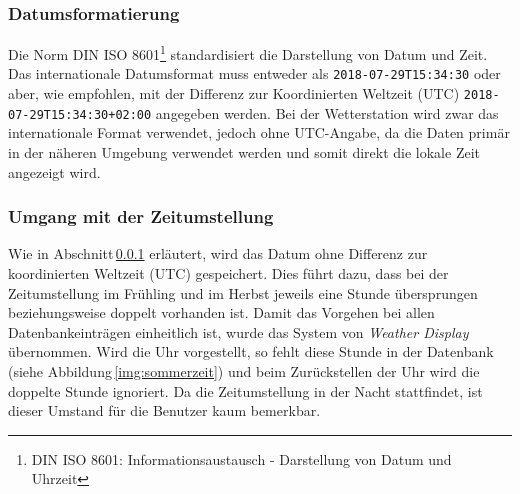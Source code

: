 





\subsubsection{Datumsformatierung}
\label{kap:dateformat}
Die Norm DIN ISO 8601\footnote{DIN ISO 8601: Informationsaustausch - Darstellung von Datum und Uhrzeit} standardisiert die Darstellung von Datum und Zeit. Das internationale Datumsformat muss entweder als \texttt{2018-07-29T15:34:30} oder aber, wie empfohlen, mit der Differenz zur Koordinierten Weltzeit (UTC) \texttt{2018-07-29T15:34:30+02:00} angegeben werden. Bei der Wetterstation wird zwar das internationale Format verwendet, jedoch ohne UTC-Angabe, da die Daten primär in der näheren Umgebung verwendet werden und somit direkt die lokale Zeit angezeigt wird.


\subsubsection{Umgang mit der Zeitumstellung}
Wie in Abschnitt\,\ref{kap:dateformat} erläutert, wird das Datum ohne Differenz zur koordinierten Weltzeit (UTC) gespeichert. Dies führt dazu, dass bei der Zeitumstellung im Frühling und im Herbst jeweils eine Stunde übersprungen beziehungsweise doppelt vorhanden ist. Damit das Vorgehen bei allen Datenbankeinträgen einheitlich ist, wurde das System von \emph{Weather Display} übernommen. Wird die Uhr vorgestellt, so fehlt diese Stunde in der Datenbank (siehe Abbildung\,\ref{img:sommerzeit}) und beim Zurückstellen der Uhr wird die doppelte Stunde ignoriert. Da die Zeitumstellung in der Nacht stattfindet, ist dieser Umstand für die Benutzer kaum bemerkbar.

